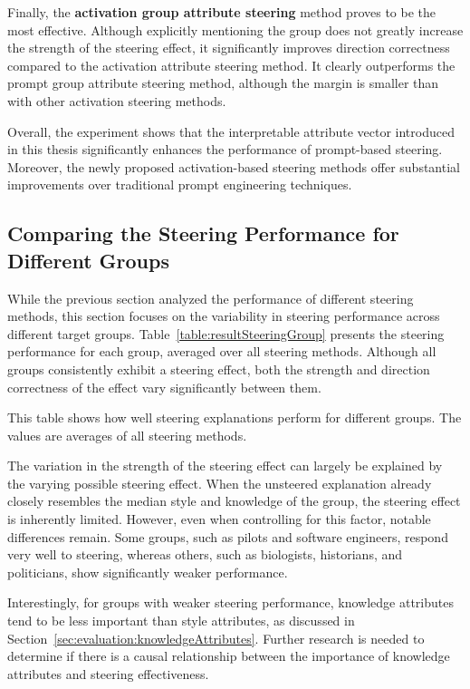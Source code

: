 Finally, the \textbf{activation group attribute steering} method proves to be the most effective. Although explicitly mentioning the group does not greatly increase the strength of the steering effect, it significantly improves direction correctness compared to the activation attribute steering method. It clearly outperforms the prompt group attribute steering method, although the margin is smaller than with other activation steering methods.

Overall, the experiment shows  that the interpretable attribute vector introduced in this thesis significantly enhances the performance of prompt-based steering. Moreover, the newly proposed activation-based steering methods offer substantial improvements over traditional prompt engineering techniques.


\subsection{Comparing the Steering Performance for Different Groups}%
\label{sec:evaluation:steering:groups}

While the previous section analyzed the performance of different steering methods, this section focuses on the variability in steering performance across different target groups. Table~\ref{table:resultSteeringGroup} presents the steering performance for each group, averaged over all steering methods. Although all groups consistently exhibit a steering effect, both the strength and direction correctness of the effect vary significantly between them.

\begin{table}[ht]
  \caption[]{This table shows how well steering explanations perform for different groups. The values are averages of all steering methods.}%
  \label{table:resultSteeringGroup}
  \centering
  \resultSteeringGroup{}%
\end{table}

The variation in the strength of the steering effect can largely be explained by the varying possible steering effect. When the unsteered explanation already closely resembles the median style and knowledge of the group, the steering effect is inherently limited. However, even when controlling for this factor, notable differences remain. Some groups, such as pilots and software engineers, respond very well to steering, whereas others, such as biologists, historians, and politicians, show significantly weaker performance.

Interestingly, for groups with weaker steering performance, knowledge attributes tend to be less important than style attributes, as discussed in Section~\ref{sec:evaluation:knowledgeAttributes}. Further research is needed to determine if there is a causal relationship between the importance of knowledge attributes and steering effectiveness.

